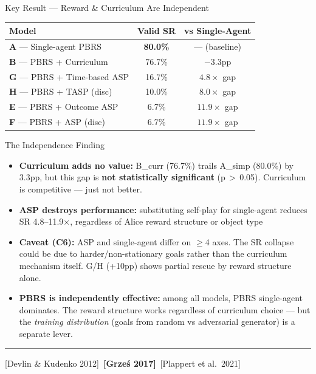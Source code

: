 \documentclass[aspectratio=169,xcolor=dvipsnames,t]{beamer}
\newcommand{\litfooter}[1]{%
  \vspace{2pt}%
  \hrule%
  \vspace{2pt}%
  {\tiny\color{LightDarkGrey} #1}%
}
\begin{document}
\begin{frame}[t]{Key Result — Reward \& Curriculum Are Independent}
  \begin{center}
    \small
    \begin{tabular}{lcc}
      \toprule
      \textbf{Model} & \textbf{Valid SR} & \textbf{vs Single-Agent} \\
      \midrule
      \rowcolor{hlgreen!15}
      \textbf{A} — Single-agent PBRS & \textbf{80.0\%} & — (baseline) \\
      \textbf{B} — PBRS + Curriculum & 76.7\% & $-3.3$pp \\
      \midrule
      \textbf{G} — PBRS + Time-based ASP & 16.7\% & $4.8\times$ gap \\
      \textbf{H} — PBRS + TASP (disc) & 10.0\% & $8.0\times$ gap \\
      \textbf{E} — PBRS + Outcome ASP & 6.7\% & $11.9\times$ gap \\
      \textbf{F} — PBRS + ASP (disc) & 6.7\% & $11.9\times$ gap \\
      \bottomrule
    \end{tabular}
  \end{center}

  \vspace{1pt}
  \begin{block}{The Independence Finding}
    \small
    \begin{itemize}
      \item \textbf{Curriculum adds no value:} B\_curr (76.7\%) trails A\_simp (80.0\%) by 3.3pp, but this gap is \textbf{not statistically significant} (p\,$>$\,0.05). Curriculum is competitive — just not better.
      \item \textbf{ASP destroys performance:} substituting self-play for single-agent reduces SR 4.8–11.9$\times$, regardless of Alice reward structure or object type
      \item \textbf{Caveat (C6):} ASP and single-agent differ on $\ge$4 axes. The SR collapse could be due to harder/non-stationary goals rather than the curriculum mechanism itself. G/H (+10pp) shows partial rescue by reward structure alone.
      \item \textbf{PBRS is independently effective:} among all models, PBRS single-agent dominates. The reward structure works regardless of curriculum choice — but the \emph{training distribution} (goals from random vs adversarial generator) is a separate lever.
    \end{itemize}
  \end{block}

  \vfill\litfooter{[Devlin \& Kudenko 2012]~\textbf{[Grze\'s 2017]}~[Plappert et al.\ 2021]}
\end{frame}
\end{document}
